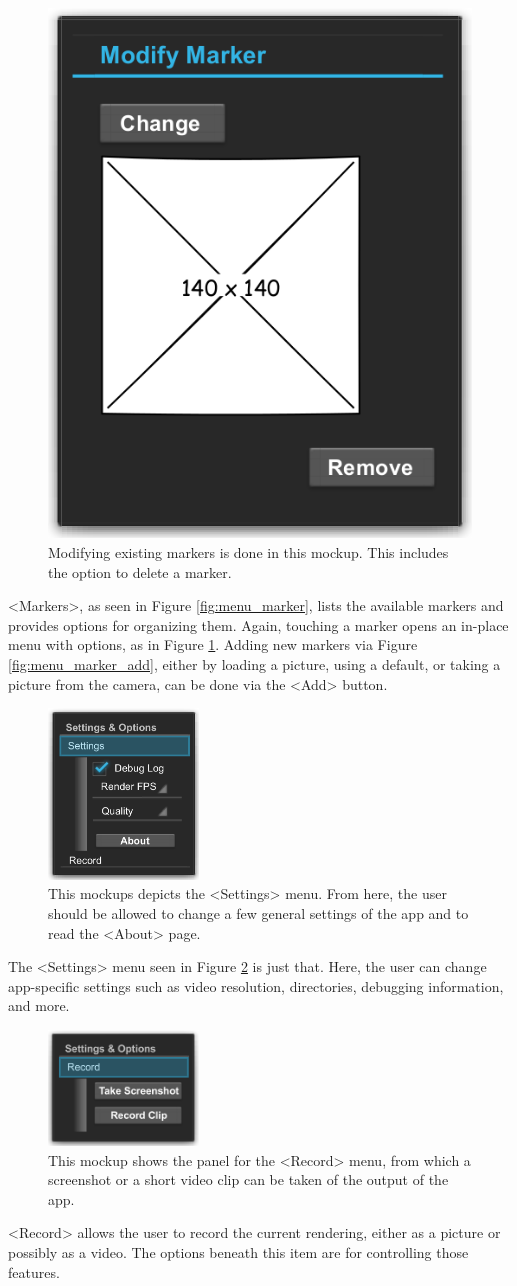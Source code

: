 \begin{figure}[H]
		\centering
		\includegraphics[width=0.25\linewidth]{img/menu_marker_modify.png}
		\caption[Modify Marker Menu Mockup.]{Modifying existing markers is done in this mockup. This includes the option to delete a marker.}
		\label{fig:menu_marker_modify}
	\endminipage\hfill
\end{figure}

<Markers>, as seen in Figure \ref{fig:menu_marker}, lists the available markers and provides options for organizing them.
Again, touching a marker opens an in-place menu with options, as in Figure \ref{fig:menu_marker_modify}.
Adding new markers via Figure \ref{fig:menu_marker_add}, either by loading a picture, using a default, or taking a picture from the camera, can be done via the <Add> button.

\begin{figure}[H]
	\centering
	\includegraphics[width=4cm]{img/menu_settings.png}
	\caption[Settings Menu Mockup.]{This mockups depicts the <Settings> menu. From here, the user should be allowed to change a few general settings of the app and to read the <About> page.}
	\label{fig:menu_settings}
\end{figure}

The <Settings> menu seen in Figure \ref{fig:menu_settings} is just that.
Here, the user can change app-specific settings such as video resolution, directories, debugging information, and more.

\begin{figure}[H]
	\centering
	\includegraphics[width=4cm]{img/menu_record.png}
	\caption[Record Menu Mockup.]{This mockup shows the panel for the <Record> menu, from which a screenshot or a short video clip can be taken of the output of the app.}
	\label{fig:menu_record}
\end{figure}

<Record> allows the user to record the current rendering, either as a picture or possibly as a video.
The options beneath this item are for controlling those features.
